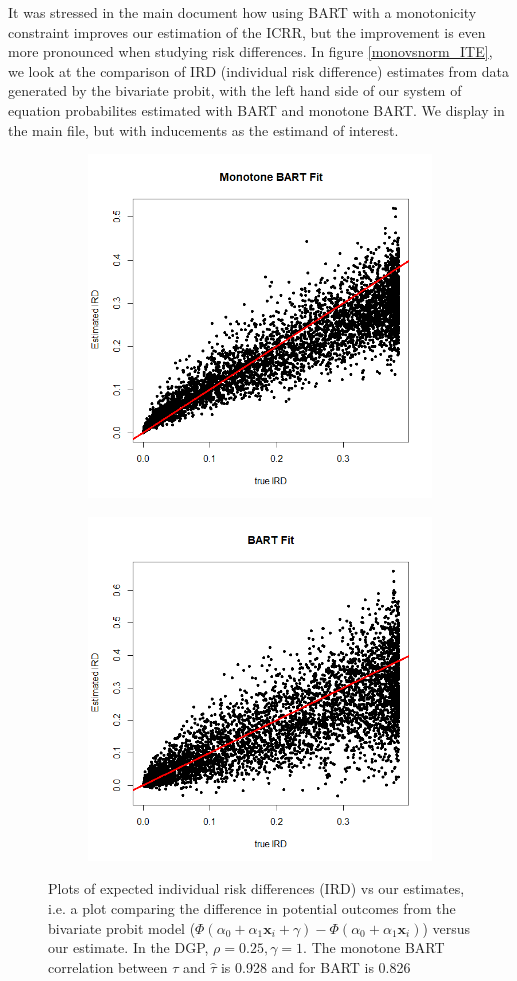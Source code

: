 \documentclass[aoas,preprint, 11pt, dvipsnames, table, x11name]{imsart}
\renewcommand{\bm}[1]{\mathbf{#1}}
\theoremstyle{remark}
\begin{document}
	
	It was stressed in the main document how using  BART with a monotonicity constraint improves our estimation of the ICRR, but the improvement is even more pronounced when studying risk differences.  
	In figure \autoref{monovsnorm_ITE}, we look at the comparison of IRD (individual risk difference) estimates from data generated by the bivariate probit, with the left hand side of our system of equation probabilites estimated with BART and monotone BART.  We display in the main file, but with inducements as the estimand of interest.
	\begin{figure}[t]
		\centering
		\begin{subfigure}{.5\textwidth}
			\includegraphics[width=6.cm]{monobartITE_png.png}
		\end{subfigure}%
		\begin{subfigure}{.5\textwidth}
			\includegraphics[width=6.cm]{BartITE_png.png}
		\end{subfigure}
		\caption{Plots of expected individual risk differences (IRD) vs our estimates, i.e. a plot comparing the difference in potential outcomes from the bivariate probit model ($\Phi(\alpha_0+\alpha_1\bm{x}_i+\gamma)-\Phi(\alpha_0+\alpha_1\bm{x}_i)$) versus our estimate.  In the DGP, $\rho=0.25,\gamma=1$.  The monotone BART correlation between $\tau$ and $\hat{\tau}$ is 0.928 and for BART is 0.826}
		\label{monovsnorm_ITE}
	\end{figure}
	
\end{document}
